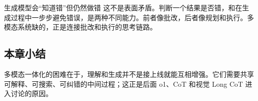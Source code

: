 \begin{warningbox}{生成模型会“知道错”但仍然做错}
这不是表面矛盾。判断一个结果是否错，和在生成过程中一步步避免错误，是两种不同能力。前者像批改，后者像规划和执行。多模态系统缺的，正是连接批改和执行的思考链路。
\end{warningbox}

\subsection{本章小结}

多模态一体化的困难在于，理解和生成并不是接上线就能互相增强。它们需要共享可解释、可搜索、可纠错的中间过程；这正是后面 o1、CoT 和视觉 Long CoT 进入讨论的原因。

